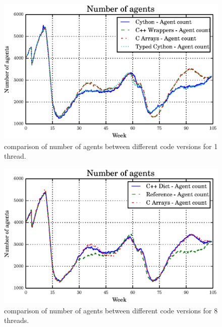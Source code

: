 \documentclass[12pt, a4paper]{report}
\begin{document}
\begin{figure}[ht!]
  \begin{center}
    \includegraphics[width=\columnwidth]{graphs/ag-single-comp.eps}
    \caption{comparison of number of agents between different code versions for 1 thread.}
    \label{fig:ag-single-comp}
  \end{center}
\end{figure}

\begin{figure}[H]
  \begin{center}
    \includegraphics[width=\columnwidth]{graphs/ag-multi-comp.eps}
    \caption{comparison of number of agents between different code versions for 8 threads.}
    \label{fig:ag-multi-comp}
  \end{center}
\end{figure}
\end{document}
